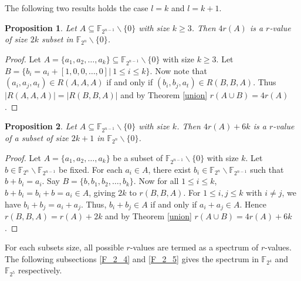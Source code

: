 \documentclass[12pt,a4paper]{article}
\newtheorem{prop}{Proposition}[section]
\begin{document}
	The following two results holds the case $l=k$ and $l=k+1$.
	
	\begin{prop}\label{2k}
		Let $A\subseteq\mathbb{F}_{2^{n-1}}\backslash\{0\}$ with size $k\geq3$. Then $4r(A)$ is a $r$-value of size $2k$ subset in $\mathbb{F}_{2^{n}}\backslash\{0\}$.
	\end{prop}
	\begin{proof}
		Let $A=\{a_1,a_2,\dots,a_k\}\subseteq\mathbb{F}_{2^{n-1}}\backslash\{0\}$ with size $k\geq3$. Let $B=\{b_i=a_i+[1,0,0,\dots,0]|~1\leq i\leq k\}$. Now note that $(a_i,a_j,a_t)\in R(A,A,A)$ if and only if $(b_i,b_j,a_t)\in R(B,B,A)$. Thus $|R(A,A,A)|=|R(B,B,A)|$ and by Theorem \ref{union} $r(A\cup B)=4r(A)$.
	\end{proof}
	
	\begin{prop}\label{2k+1}
		Let $A\subseteq\mathbb{F}_{2^{n-1}}\backslash\{0\}$ with size $k$. Then $4r(A)+6k$ is a $r$-value of a subset of size $2k+1$ in $\mathbb{F}_{2^{n}}\backslash\{0\}$.
	\end{prop}
	\begin{proof}
		Let $A=\{a_1,a_2,\dots,a_k\}$ be a subset of $\mathbb{F}_{2^{n-1}}\backslash\{0\}$ with size $k$. Let $b\in\mathbb{F}_{2^n}\backslash\mathbb{F}_{2^{n-1}}$ be fixed.
		For each $a_i\in A$, there exist $b_i\in\mathbb{F}_{2^n}\backslash\mathbb{F}_{2^{n-1}}$ such that $b+b_i=a_i$. Say $B=\{b,b_1,b_2,\dots,b_k\}$. Now for all $1\leq i\leq k$, $b+b_i=b_i+b=a_i\in A$, giving $2k$ to $r(B,B,A)$. For $1\leq i,j\leq k$ with $i\neq j$, we have $b_i+b_j=a_i+a_j$. Thus, $b_i+b_j\in A$ if and only if $a_i+a_j\in A$. Hence $r(B,B,A)=r(A)+2k$ and by Theorem \ref{union} $r(A\cup B)=4r(A)+6k$.
	\end{proof}
	
	For each subsets size, all possible $r$-values are termed as a spectrum of $r$-values. The following subsections \ref{F_2_4} and \ref{F_2_5} gives the spectrum in $\mathbb{F}_{2^4}$ and $\mathbb{F}_{2^5}$ respectively.
\end{document}

